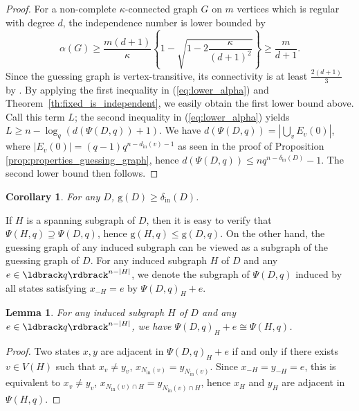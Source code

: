 \documentclass[a4paper, 11pt]{book}
\numberwithin{equation}{section}
\theoremstyle{plain}
\newtheorem{corollary}	[equation]	{Corollary}
\newtheorem{lemma}		[equation]	{Lemma}
\newcommand{\neighbourhood}{N}
\newcommand{\degree}{d}
\newcommand{\dMin}{\delta}
\newcommand{\inn}[1]{#1_\mathrm{in}}
\newcommand{\NIn}{\inn{\neighbourhood}}
\newcommand{\dIn}{\inn{\degree}}
\newcommand{\dInMin}{\inn{\dMin}}
\newcommand{\guessing}{\mathrm{g}}
\newcommand{\guessingGraph}{\Psi}
\renewcommand{\(}{\ldbrack}
\renewcommand{\)}{\rdbrack}
\begin{document}
\begin{proof}
For a non-complete $\kappa$-connected graph $G$ on $m$ vertices which is regular with degree $d$, the independence number is lower bounded by \cite{HS01}
\begin{equation} \label{eq:lower_alpha}
	\alpha(G) \geq \frac{m(d+1)}{\kappa} \left\{ 1 - \sqrt{1 - 2\frac{\kappa}{(d+1)^2}} \right\} \geq \frac{m}{d+1}.
\end{equation}
Since the guessing graph is vertex-transitive, its connectivity is at least $\frac{2 (d+1)}{3}$ by \cite{Bab94}. By applying the first inequality in (\ref{eq:lower_alpha}) and Theorem~\ref{th:fixed_is_independent}, we easily obtain the first lower bound above. Call this term $L$; the second inequality in (\ref{eq:lower_alpha}) yields $L \ge n - \log_q(d(\guessingGraph(D,q)) + 1)$. We have $d(\guessingGraph(D,q)) = |\bigcup_v E_v (0)|$, where $|E_v (0)| = (q-1)q^{n - \dIn(v) - 1}$ as seen in the proof of Proposition \ref{prop:properties_guessing_graph}, hence $d(\guessingGraph(D,q)) \le nq^{n-\dInMin(D)} - 1$. The second lower bound then follows.
\end{proof}

\begin{corollary} \label{cor:guessing>dinmin}
For any $D$, $\guessing(D) \ge \dInMin(D)$.
\end{corollary}



If $H$ is a spanning subgraph of $D$, then it is easy to verify that $\guessingGraph(H,q) \supseteq \guessingGraph(D,q)$, hence $\guessing(H, q) \le \guessing(D,q)$. On the other hand, the guessing graph of any induced subgraph can be viewed as a subgraph of the guessing graph of $D$. For any induced subgraph $H$ of $D$ and any $e \in \(q\)^{n-|H|}$, we denote the subgraph of $\guessingGraph(D,q)$ induced by all states satisfying $x_{- H} = e$ by $\guessingGraph(D,q)_H + e$. 

\begin{lemma} \label{lemma:guessing_subgraph}
For any induced subgraph $H$ of $D$ and any $e \in \(q\)^{n-|H|}$, we have $\guessingGraph(D,q)_H +e \cong \guessingGraph(H,q)$.
\end{lemma}


\begin{proof}
Two states $x,y$ are adjacent in $\guessingGraph(D,q)_H + e$ if and only if there exists $v\in V(H)$ such that $x_v \ne y_v$, $x_{\NIn(v)} = y_{\NIn(v)}$. Since $x_{- H} = y_{- H} = e$, this is equivalent to $x_v \ne y_v$, $x_{\NIn(v) \cap H} = y_{\NIn(v) \cap H}$, hence $x_H$ and $y_H$ are adjacent in $\guessingGraph(H,q)$.
\end{proof}
\end{document}
